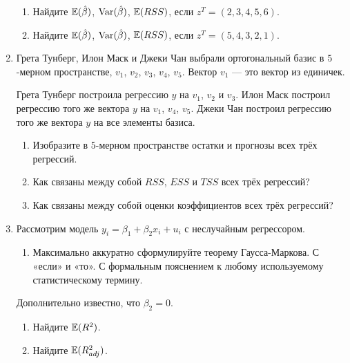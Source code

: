 \begin{enumerate}
\begin{enumerate}
\item Найдите $\operatorname{\mathbb{E}}(\hat{\beta})$, $\operatorname{Var}(\hat{\beta})$, $\operatorname{\mathbb{E}}(RSS)$, если $z^T = (2, 3, 4, 5, 6)$.
\item Найдите $\operatorname{\mathbb{E}}(\hat{\beta})$, $\operatorname{Var}(\hat{\beta})$, $\operatorname{\mathbb{E}}(RSS)$, если $z^T = (5, 4, 3, 2, 1)$.
\end{enumerate}

\item Грета Тунберг, Илон Маск и Джеки Чан выбрали ортогональный базис в $5$-мерном пространстве, 
$v_1$, $v_2$, $v_3$, $v_4$, $v_5$. Вектор $v_1$ — это вектор из единичек. 

Грета Тунберг построила регрессию $y$ на $v_1$, $v_2$ и $v_3$.
Илон Маск построил регрессию того же вектора $y$ на $v_1$, $v_4$, $v_5$.
Джеки Чан построил регрессию того же вектора $y$ на все элементы базиса.

\begin{enumerate}

\item Изобразите в $5$-мерном пространстве остатки и прогнозы всех трёх регрессий. 

\item Как связаны между собой $RSS$, $ESS$ и $TSS$ всех трёх регрессий?

\item Как связаны между собой оценки коэффициентов всех трёх регрессий?

\end{enumerate}

\item Рассмотрим модель $y_i = \beta_1 + \beta_2 x_i + u_i$ с неслучайным регрессором.

\begin{enumerate}
\item Максимально аккуратно сформулируйте теорему Гаусса-Маркова. С «если» и «то». 
С формальным пояснением к любому используемому статистическому термину. 
\end{enumerate}

Дополнительно известно, что $\beta_2 = 0$.
\begin{enumerate}[resume]
\item Найдите $\operatorname{\mathbb{E}}(R^2)$.
\item Найдите $\operatorname{\mathbb{E}}(R^2_{adj})$.
\end{enumerate}

\end{enumerate}



